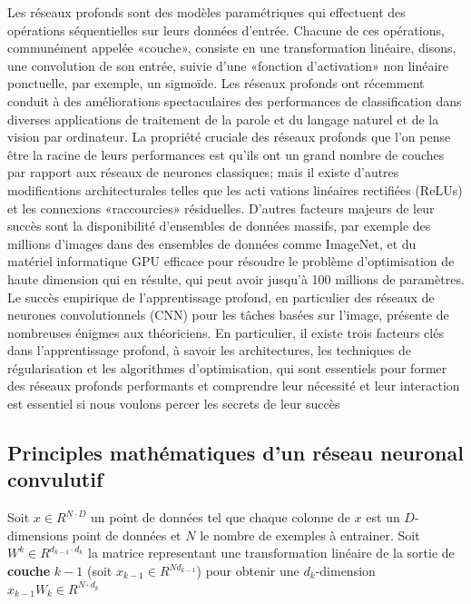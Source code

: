 \documentclass[
  11pt,
  dvipsnames]{article}
\begin{document}
Les réseaux profonds sont des modèles paramétriques qui effectuent des opérations séquentielles sur leurs données d'entrée. Chacune de ces opérations, communément appelée «couche», consiste en une transformation linéaire, disons, une convolution de son entrée, suivie d'une «fonction d'activation» non linéaire ponctuelle, par exemple, un sigmoïde. Les réseaux profonds ont récemment conduit à des améliorations spectaculaires des performances de classification dans diverses applications de traitement de la parole et du langage naturel et de la vision par ordinateur. La propriété cruciale des réseaux profonds que l'on pense être la racine de leurs performances est qu'ils ont un grand nombre de couches par rapport aux réseaux de neurones classiques; mais il existe d'autres modifications architecturales telles que les acti vations linéaires rectifiées (ReLUs) et les connexions «raccourcies» résiduelles. D'autres facteurs majeurs de leur succès sont la disponibilité d'ensembles de données massifs, par exemple des millions d'images dans des ensembles de données comme ImageNet, et du matériel informatique GPU efficace pour résoudre le problème d'optimisation de haute dimension qui en résulte, qui peut avoir jusqu'à 100 millions de paramètres. Le succès empirique de l'apprentissage profond, en particulier des réseaux de neurones convolutionnels (CNN) pour les tâches basées sur l'image, présente de nombreuses énigmes aux théoriciens. En particulier, il existe trois facteurs clés dans l'apprentissage profond, à savoir les architectures, les techniques de régularisation et les algorithmes d'optimisation, qui sont essentiels pour former des réseaux profonds performants et comprendre leur nécessité et leur interaction est essentiel si nous voulons percer les secrets de leur succès

\hypertarget{principles-mathuxe9matiques-dun-ruxe9seau-neuronal-convulutif}{%
\subsection{Principles mathématiques d'un réseau neuronal convulutif}\label{principles-mathuxe9matiques-dun-ruxe9seau-neuronal-convulutif}}

Soit \(x \in R^{N \cdot D}\) un point de données tel que chaque colonne de \(x\) est un \(D\)-dimensions point de données et \(N\) le nombre de exemples à entrainer. Soit \(W^k \in R^{d_{k-1} \cdot d_k}\) la matrice representant une transformation linéaire de la sortie de \textbf{couche} \(k-1\) (soit \(x_{k-1} \in R ^{Nd_{k-1}}\)) pour obtenir une \(d_k\)-dimension \(x_{k-1}W_{k} \in R^{N \cdot d_{k}}\)
\end{document}
